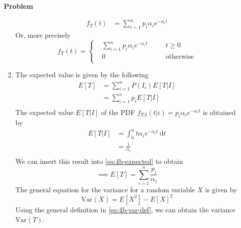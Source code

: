\documentclass[12pt]{article}
\newenvironment{Ex}{\textbf{Problem}\vspace{.75em}\\}{}
\newcommand{\dd}[1]{\:\mathrm{d}{#1}}
\begin{document}
\begin{enumerate}
\begin{Ex}
\begin{solution}
\begin{enumerate}
\begin{equation}
\begin{aligned}
            f_T(t) &= \sum_{i=1}^{n} p_i \alpha_i e^{-\alpha_i t}
          \end{aligned}
        \end{equation}
        Or, more precisely
        \begin{equation}
          \label{eq:4a-sol}
          f_T(t) = \left\{
            \begin{aligned}
              & \sum_{i=1}^{n} p_i \alpha_i e^{-\alpha_i t} &&\quad
              t\ge0 \\
              & 0 &&\quad\text{otherwise} \\
            \end{aligned} \right.
        \end{equation}
      \item The expected value is given by the following
        \begin{equation}
          \label{eq:4b-expected}
          \begin{aligned}
            E[T] &= \sum_{i=1}^n P(I_i)E[T|I] \\
            &= \sum_{i=1}^n p_i E[T|I] \\
          \end{aligned}
        \end{equation}
        The expected value $E[T|I]$ of the PDF $f_{T|I}(t|i)=p_i \alpha_i
        e^{-\alpha_i t}$ is obtained by
        \begin{equation}
          \label{eq:4b-expected-conditional}
          \begin{aligned}
            E[T|I] &= \int_0^{n} t \alpha_i e^{-\alpha_i t} \dd{t} \\
            &= \frac{1}{\alpha_i} \\
          \end{aligned}
        \end{equation}
        We can insert this result into \cref{eq:4b-expected} to obtain
        \begin{equation}
          \label{eq:4b-presol}
          \implies E[T] = \sum_{i=1}^n \frac{p_i}{\alpha_i}
        \end{equation}
        The general equation for the variance for a random variable
        $X$ is given by
        \begin{equation}
          \label{eq:4b-var-def}
          \text{Var}(X) = E[X^2] - E[X]^2
        \end{equation}
        Using the general definition in \cref{eq:4b-var-def}, we can
        obtain the variance $\text{Var}(T)$.

\end{enumerate}
\end{solution}
\end{Ex}
\end{enumerate}
\end{document}
